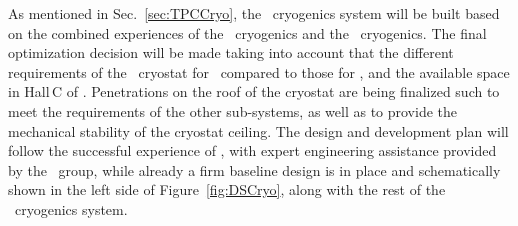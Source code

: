 As mentioned in Sec.~\ref{sec:TPCCryo}, the \AAr\ cryogenics system will be built based on the combined experiences of the  \pDUNE\  cryogenics and the \DSfs\ cryogenics. The final optimization decision will be made taking into account that the different requirements of the \AAr\ cryostat for \DSks\ compared to those for \pDUNE, and the available space in Hall\,C of \LNGS. Penetrations on the roof of the cryostat are being finalized such to meet the requirements of the other sub-systems, as well as to provide the mechanical stability of the cryostat ceiling. The design and development plan will follow the successful experience of \pDUNE, with expert engineering assistance provided by the \CERN\ group, while already a firm baseline design is in place and schematically shown in the left side of Figure~\ref{fig:DSCryo}, along with the rest of the \DSks\ cryogenics system.